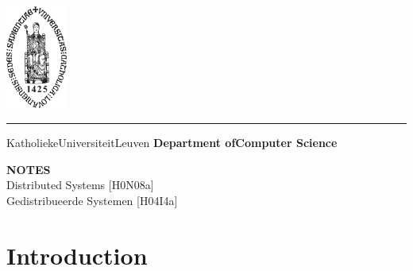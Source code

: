 \documentclass[a4paper]{article}
\begin{document}
\begin{titlepage}
    \newpage
    \thispagestyle{empty}
    \frenchspacing
    \hspace{-0.2cm}
    \includegraphics[height=3.4cm]{assets/sedes}
    \hspace{0.2cm}
    \rule{0.5pt}{3.4cm}
    \hspace{0.2cm}
    \begin{minipage}[b]{8cm}
        \Large{Katholieke\newline Universiteit\newline Leuven}\smallskip\newline
        \large{}\smallskip\newline
        \textbf{Department of\newline Computer Science}\smallskip
    \end{minipage}
    \vspace*{3.2cm}\vfill
    \begin{center}
        \begin{minipage}[t]{\textwidth}
            \begin{center}
                \large{\rm{\textbf{\uppercase{Notes}}}}\\
                \large{\rm{Distributed Systems [H0N08a]}}\\
                \large{\rm{Gedistribueerde Systemen [H04I4a]}}
            \end{center}
        \end{minipage}
    \end{center}
    \vfill
    \hfill{}
\end{titlepage}

\tableofcontents

\newpage

\section{Introduction}
\end{document}
